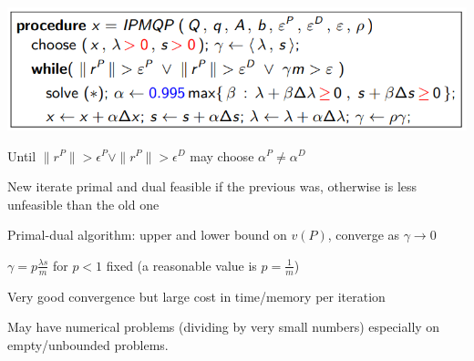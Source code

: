 \documentclass[10pt]{report}
\begin{document}
\begin{center}
	\includegraphics[scale=0.75]{17.png}
\end{center}
\begin{list}{}{}
	\item Until $\|r^P\|>\epsilon^P\vee\|r^P\|>\epsilon^D$ may choose $\alpha^P\neq \alpha^D$
	\item New iterate primal and dual feasible if the previous was, otherwise is less unfeasible than the old one
	\item Primal-dual algorithm: upper and lower bound on $v(P)$, converge as $\gamma\rightarrow 0$
	\item $\gamma = p\frac{\lambda s}{m}$ for $p<1$ fixed (a reasonable value is $p=\frac{1}{m}$)
	\item Very good convergence but large cost in time/memory per iteration
	\item May have numerical problems (dividing by very small numbers) especially on empty/unbounded problems.
\end{list}
\end{document}

